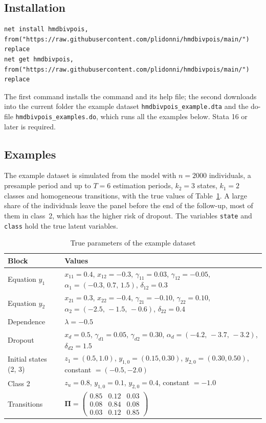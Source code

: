 \documentclass[11pt,a4paper]{article}
\newcommand{\cmd}[1]{\texttt{#1}}
\begin{document}
\subsection{Installation}

\begin{lstlisting}
net install hmdbivpois, from("https://raw.githubusercontent.com/plidonni/hmdbivpois/main/") replace
net get hmdbivpois, from("https://raw.githubusercontent.com/plidonni/hmdbivpois/main/") replace
\end{lstlisting}
The first command installs the command and its help file; the second downloads into the current folder
the example dataset \cmd{hmdbivpois\_example.dta} and the do-file \cmd{hmdbivpois\_examples.do}, which
runs all the examples below. Stata 16 or later is required.

\subsection{Examples}

The example dataset is simulated from the model with $n=2000$ individuals, a presample period and up to
$T=6$ estimation periods, $k_2=3$ states, $k_1=2$ classes and homogeneous transitions, with the true
values of Table~\ref{tab:true}. A large share of the individuals leave the panel before the end of the
follow-up, most of them in class~2, which has the higher risk of dropout. The variables \cmd{state} and \cmd{class} hold the true latent
variables.

\begin{table}[h]
\centering\footnotesize
\caption{True parameters of the example dataset}\label{tab:true}
\begin{tabular}{ll}
\toprule
Block & Values\\
\midrule
Equation $y_1$ & $x_{11}=0.4$, $x_{12}=-0.3$, $\gamma_{11}=0.03$, $\gamma_{12}=-0.05$, $\alpha_{1}=(-0.3,\,0.7,\,1.5)$, $\delta_{12}=0.3$\\
Equation $y_2$ & $x_{21}=0.3$, $x_{22}=-0.4$, $\gamma_{21}=-0.10$, $\gamma_{22}=0.10$, $\alpha_{2}=(-2.5,\,-1.5,\,-0.6)$, $\delta_{22}=0.4$\\
Dependence & $\lambda=-0.5$\\
Dropout & $x_d=0.5$, $\gamma_{d1}=0.05$, $\gamma_{d2}=0.30$, $\alpha_d=(-4.2,\,-3.7,\,-3.2)$, $\delta_{d2}=1.5$\\
Initial states (2, 3) & $z_1=(0.5,1.0)$, $y_{1,0}=(0.15,0.30)$, $y_{2,0}=(0.30,0.50)$, constant $=(-0.5,-2.0)$\\
Class 2 & $z_u=0.8$, $y_{1,0}=0.1$, $y_{2,0}=0.4$, constant $=-1.0$\\
Transitions & $\bm\Pi=\begin{pmatrix}0.85&0.12&0.03\\0.08&0.84&0.08\\0.03&0.12&0.85\end{pmatrix}$\\
\bottomrule
\end{tabular}
\end{table}
\end{document}
